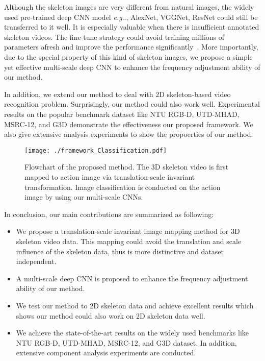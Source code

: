 \documentclass[10pt,journal]{IEEEtran}
\makeatletter
\DeclareRobustCommand\onedot{\futurelet\@let@token\@onedot}
\def\@onedot{\ifx\@let@token.\else.\null\fi\xspace}
\def\eg{\emph{e.g}\onedot} \def\Eg{\emph{E.g}\onedot}
\makeatother
\begin{document}
Although the skeleton images are very different from natural images, the widely used pre-trained deep CNN model \eg, AlexNet\cite{krizhevsky2012imagenet}, VGGNet\cite{Simonyan2014Very}, ResNet\cite{ResNet} could still be transferred to it well. It is especially valuable when there is insufficient annotated skeleton videos. The fine-tune strategy could avoid training millions of parameters afresh and improve the performance significantly~\cite{Wang2016Action, Girshick2013Rich}. More importantly, due to the special property of this kind of skeleton images, we propose a simple yet effective multi-scale deep CNN to enhance the frequency adjustment ability of our method. 

In addition, we extend our method to deal with 2D skeleton-based video recognition problem. Surprisingly, our method could also work well. Experimental results on the popular benchmark dataset like NTU RGB-D, UTD-MHAD, MSRC-12, and G3D demonstrate the effectiveness our proposed framework. We also give extensive analysis experiments to show the propoerties of our method.


\begin{figure*}[!htb]
\centering
\texttt{[image: ./framework\_Classification.pdf]}
\caption{Flowchart of the proposed method. The 3D skeleton video is first mapped to action image via translation-scale invariant transformation. Image classification is conducted on the action image by using our multi-scale CNNs.}
\label{fig:flowchart}
\end{figure*}


In conclusion, our main contributions are summarized as following:
\begin{itemize}
  \item We propose a translation-scale invariant image mapping method for 3D skeleton video data. This mapping could avoid the translation and scale influence of the skeleton data, thus is more distinctive and dataset independent.
  


  \item A multi-scale deep CNN is proposed to enhance the frequency adjustment ability of our method.
  
  \item We test our method to 2D skeleton data and achieve excellent results which shows our method could also work on 2D skeleton data well.

  \item We achieve the state-of-the-art results on the widely used benchmarks like NTU RGB-D, UTD-MHAD, MSRC-12, and G3D dataset. In addition, extensive component analysis experiments are conducted.
\end{itemize}
\end{document}
